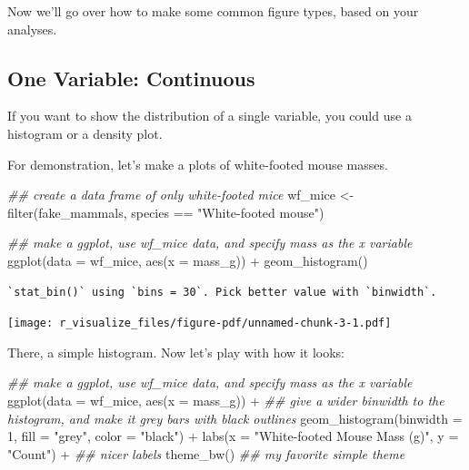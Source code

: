 \documentclass[
  letterpaper,
  DIV=11,
  numbers=noendperiod]{scrreprt}
\newenvironment{Shaded}{\begin{snugshade}}{\end{snugshade}}
\newcommand{\AttributeTok}[1]{\textcolor[rgb]{0.40,0.45,0.13}{#1}}
\newcommand{\DecValTok}[1]{\textcolor[rgb]{0.68,0.00,0.00}{#1}}
\newcommand{\DocumentationTok}[1]{\textcolor[rgb]{0.37,0.37,0.37}{\textit{#1}}}
\newcommand{\FunctionTok}[1]{\textcolor[rgb]{0.28,0.35,0.67}{#1}}
\newcommand{\NormalTok}[1]{\textcolor[rgb]{0.00,0.23,0.31}{#1}}
\newcommand{\OtherTok}[1]{\textcolor[rgb]{0.00,0.23,0.31}{#1}}
\newcommand{\SpecialCharTok}[1]{\textcolor[rgb]{0.37,0.37,0.37}{#1}}
\newcommand{\StringTok}[1]{\textcolor[rgb]{0.13,0.47,0.30}{#1}}
\begin{document}
Now we'll go over how to make some common figure types, based on your
analyses.

\subsection{One Variable: Continuous}\label{one-variable-continuous}

If you want to show the distribution of a single variable, you could use
a histogram or a density plot.

For demonstration, let's make a plots of white-footed mouse masses.

\begin{Shaded}
\begin{Highlighting}[]
\DocumentationTok{\#\# create a data frame of only white{-}footed mice}
\NormalTok{wf\_mice }\OtherTok{\textless{}{-}} \FunctionTok{filter}\NormalTok{(fake\_mammals, species }\SpecialCharTok{==} \StringTok{"White{-}footed mouse"}\NormalTok{)}

\DocumentationTok{\#\# make a ggplot, use wf\_mice data, and specify mass as the x variable}
\FunctionTok{ggplot}\NormalTok{(}\AttributeTok{data =}\NormalTok{ wf\_mice, }\FunctionTok{aes}\NormalTok{(}\AttributeTok{x =}\NormalTok{ mass\_g)) }\SpecialCharTok{+}
  \FunctionTok{geom\_histogram}\NormalTok{()}
\end{Highlighting}
\end{Shaded}

\begin{verbatim}
`stat_bin()` using `bins = 30`. Pick better value with `binwidth`.
\end{verbatim}

\texttt{[image: r\_visualize\_files/figure-pdf/unnamed-chunk-3-1.pdf]}

There, a simple histogram. Now let's play with how it looks:

\begin{Shaded}
\begin{Highlighting}[]
\DocumentationTok{\#\# make a ggplot, use wf\_mice data, and specify mass as the x variable}
\FunctionTok{ggplot}\NormalTok{(}\AttributeTok{data =}\NormalTok{ wf\_mice, }\FunctionTok{aes}\NormalTok{(}\AttributeTok{x =}\NormalTok{ mass\_g)) }\SpecialCharTok{+}
  \DocumentationTok{\#\# give a wider binwidth to the histogram, and make it grey bars with black outlines}
  \FunctionTok{geom\_histogram}\NormalTok{(}\AttributeTok{binwidth =} \DecValTok{1}\NormalTok{, }\AttributeTok{fill =} \StringTok{"grey"}\NormalTok{, }\AttributeTok{color =} \StringTok{"black"}\NormalTok{) }\SpecialCharTok{+} 
  \FunctionTok{labs}\NormalTok{(}\AttributeTok{x =} \StringTok{"White{-}footed Mouse Mass (g)"}\NormalTok{, }\AttributeTok{y =} \StringTok{"Count"}\NormalTok{) }\SpecialCharTok{+} \DocumentationTok{\#\# nicer labels}
  \FunctionTok{theme\_bw}\NormalTok{() }\DocumentationTok{\#\# my favorite simple theme}
\end{Highlighting}
\end{Shaded}
\end{document}
